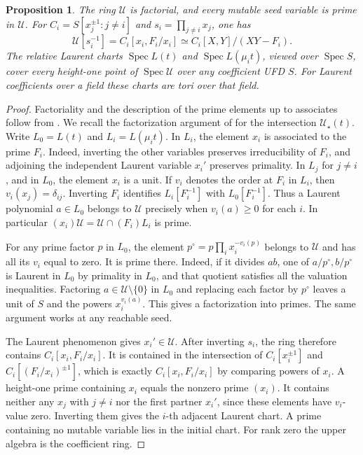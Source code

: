 \documentclass[11pt,reqno]{amsart}
\numberwithin{equation}{section}
\newtheorem{proposition}[theorem]{Proposition}
\theoremstyle{definition}
\theoremstyle{remark}
\DeclareMathOperator{\Spec}{Spec}
\begin{document}
\begin{proposition}\label{prop:upper-factorial}
The ring \(\mathcal U\) is factorial, and every mutable seed variable
is prime in \(\mathcal U\). For \(C_i=S[x_j^{\pm1}:j\ne i]\) and
\(s_i=\prod_{j\ne i}x_j\), one has
\[ \mathcal U[s_i^{-1}]=C_i[x_i,F_i/x_i] \simeq C_i[X,Y]/(XY-F_i). \]
The relative Laurent charts \(\Spec L(t)\) and \(\Spec L(\mu_i t)\),
viewed over \(\Spec S\), cover every height-one
point of \(\Spec\mathcal U\) over any coefficient UFD \(S\). For Laurent
coefficients over a field these charts are tori over that field.
\end{proposition}
\begin{proof}
Factoriality and the description of the prime elements up to associates
follow from \cite[Proposition~2.2]{Minuscule}. We recall the factorization
argument of \cite{Pompili} for the intersection \(\mathcal U_\star(t)\).
Write \(L_0=L(t)\) and \(L_i=L(\mu_i t)\).
In \(L_i\), the element \(x_i\) is associated to the prime \(F_i\).
Indeed, inverting the other variables preserves irreducibility of \(F_i\),
and adjoining the independent Laurent variable \(x_i'\) preserves
primality. In \(L_j\) for \(j\ne i\), and in \(L_0\), the element
\(x_i\) is a unit. If \(v_i\) denotes the order at \(F_i\) in \(L_i\),
then \(v_i(x_j)=\delta_{ij}\). Inverting \(F_i\) identifies \(L_i[F_i^{-1}]\)
with \(L_0[F_i^{-1}]\). Thus a Laurent polynomial \(a\in L_0\) belongs
to \(\mathcal U\) precisely when \(v_i(a)\ge0\) for each \(i\).
In particular \((x_i)\mathcal U=\mathcal U\cap(F_i)L_i\) is prime.

For any prime factor \(p\) in \(L_0\), the element
\(p^\circ=p\prod_i x_i^{-v_i(p)}\) belongs to \(\mathcal U\) and has
all its \(v_i\) equal to zero. It is prime there. Indeed, if it divides
\(ab\), one of \(a/p^\circ,b/p^\circ\) is Laurent in \(L_0\) by
primality in \(L_0\), and that quotient satisfies all the valuation
inequalities. Factoring \(a\in\mathcal U\setminus\{0\}\) in \(L_0\)
and replacing each factor by \(p^\circ\) leaves a unit of \(S\)
and the powers \(x_i^{v_i(a)}\). This gives a factorization into
primes. The same argument works at any reachable seed.

The Laurent phenomenon gives \(x_i'\in\mathcal U\).
After inverting \(s_i\), the ring therefore contains \(C_i[x_i,F_i/x_i]\).
It is contained in the intersection of \(C_i[x_i^{\pm1}]\) and
\(C_i[(F_i/x_i)^{\pm1}]\), which is exactly \(C_i[x_i,F_i/x_i]\)
by comparing powers of \(x_i\). A height-one prime containing
\(x_i\) equals the nonzero prime \((x_i)\). It contains neither
any \(x_j\) with \(j\ne i\) nor the first partner \(x_i'\), since
these elements have \(v_i\)-value zero. Inverting them gives the \(i\)-th adjacent Laurent chart.
A prime containing no mutable variable lies in the initial chart.
For rank zero the upper algebra is the coefficient ring.
\end{proof}
\end{document}
